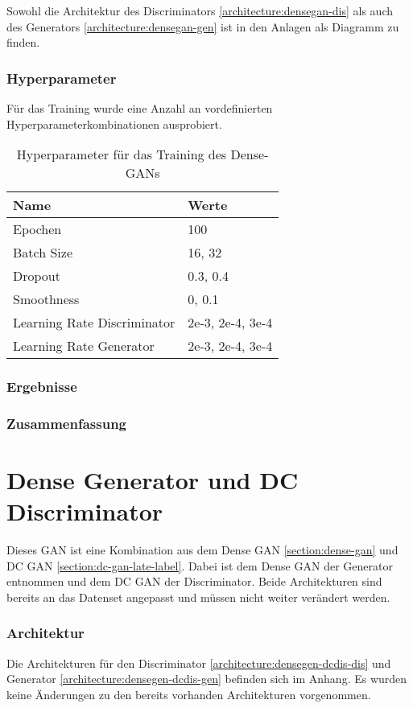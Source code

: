 Sowohl die Architektur des Discriminators \cref{architecture:densegan-dis} als auch des Generators \cref{architecture:densegan-gen} ist in den Anlagen als Diagramm zu finden.

\subsubsection{Hyperparameter}
Für das Training wurde eine Anzahl an vordefinierten Hyperparameterkombinationen ausprobiert.

\begin{table}[H]
	\centering
	\begin{tabular}{l l}
		Name                        & Werte            \\ \hline
		Epochen                     & 100              \\
		Batch Size                  & 16, 32           \\
		Dropout                     & 0.3, 0.4         \\
		Smoothness                  & 0, 0.1           \\
		Learning Rate Discriminator & 2e-3, 2e-4, 3e-4 \\
		Learning Rate Generator     & 2e-3, 2e-4, 3e-4
	\end{tabular}
	\caption{Hyperparameter für das Training des Dense-GANs}
\end{table}

\subsubsection{Ergebnisse}
\subsubsection{Zusammenfassung}

\section{Dense Generator und DC Discriminator}
Dieses GAN ist eine Kombination aus dem Dense GAN \cref{section:dense-gan} und DC GAN \cref{section:dc-gan-late-label}.
Dabei ist dem Dense GAN der Generator entnommen und dem DC GAN der Discriminator.
Beide Architekturen sind bereits an das Datenset angepasst und müssen nicht weiter verändert werden.

\subsubsection{Architektur}
Die Architekturen für den Discriminator \cref{architecture:densegen-dcdis-dis} und Generator \cref{architecture:densegen-dcdis-gen} befinden sich im Anhang.
Es wurden keine Änderungen zu den bereits vorhanden Architekturen vorgenommen.

